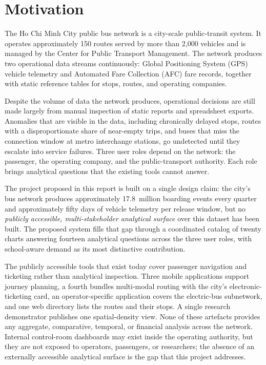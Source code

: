 \section{Motivation}
\label{sec:intro:motivation}

The Ho Chi Minh City public bus network is a city-scale public-transit
system. It operates approximately 150 routes served by more than 2,000
vehicles and is managed by the Center for Public Transport Management.
The network produces two operational data streams continuously: Global
Positioning System (GPS) vehicle telemetry and Automated Fare Collection
(AFC) fare records, together with static reference tables for stops,
routes, and operating companies.

Despite the volume of data the network produces, operational decisions
are still made largely from manual inspection of static reports and
spreadsheet exports. Anomalies that are visible in the data, including
chronically delayed stops, routes with a disproportionate share of
near-empty trips, and buses that miss the connection window at metro
interchange stations, go undetected until they escalate into service
failures. Three user roles depend on the network: the passenger, the
operating company, and the public-transport authority. Each role brings
analytical questions that the existing tools cannot answer.

The project proposed in this report is built on a single design claim:
the city's bus network produces approximately 17.8~million boarding
events every quarter and approximately fifty days of vehicle telemetry
per release window, but no \textit{publicly accessible, multi-stakeholder
analytical surface} over this dataset has been built. The proposed
system fills that gap through a coordinated catalog of twenty
charts answering fourteen analytical questions across the three user
roles, with school-aware demand as its most distinctive contribution.

The publicly accessible tools that exist today cover passenger
navigation and ticketing rather than analytical inspection. Three mobile
applications support journey planning, a fourth bundles multi-modal
routing with the city's electronic-ticketing card, an operator-specific
application covers the electric-bus subnetwork, and one web directory
lists the routes and their stops. A single research demonstrator
publishes one spatial-density view. None of these artefacts provides any
aggregate, comparative, temporal, or financial analysis across the
network. Internal control-room dashboards may exist inside the operating
authority, but they are not exposed to operators, passengers, or
researchers; the absence of an externally accessible analytical surface
is the gap that this project addresses.

